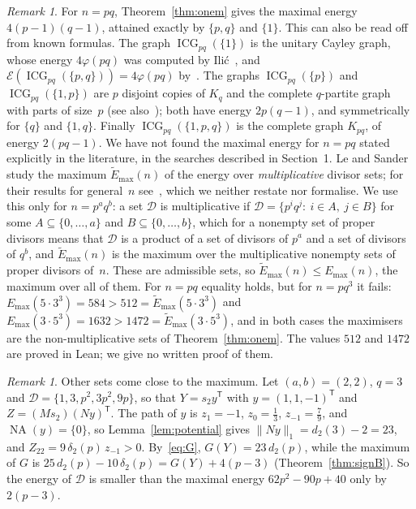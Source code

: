 \documentclass[11pt]{article}
\theoremstyle{remark}
\newtheorem{remark}[theorem]{Remark}
\newcommand{\ICG}{\operatorname{ICG}}
\newcommand{\E}{\mathcal E}
\newcommand{\NA}{\operatorname{NA}}
\begin{document}
\begin{remark}\label{rem:pq}
For $n=pq$, Theorem~\ref{thm:onem} gives the maximal energy $4(p-1)(q-1)$,
attained exactly by $\{p,q\}$ and $\{1\}$. This can also be read off from
known formulas. The graph $\ICG_{pq}(\{1\})$ is the unitary Cayley graph,
whose energy $4\varphi(pq)$ was computed by Ili\'c~\cite{ilic}, and
$\E(\ICG_{pq}(\{p,q\}))=4\varphi(pq)$ by~\cite[Theorem~4.2]{ilicbasic}. The
graphs $\ICG_{pq}(\{p\})$ and $\ICG_{pq}(\{1,p\})$ are $p$ disjoint copies of
$K_q$ and the complete $q$-partite graph with parts of size~$p$
(see also~\cite[Theorem~4.1]{ilicbasic}); both have energy $2p(q-1)$, and
symmetrically for $\{q\}$ and $\{1,q\}$. Finally $\ICG_{pq}(\{1,p,q\})$ is the
complete graph $K_{pq}$, of energy $2(pq-1)$. We have not found the maximal
energy for $n=pq$ stated explicitly in the literature, in the searches described
in Section~1. Le and Sander~\cite{lesander} study the maximum
$\tilde E_{\max}(n)$ of the energy over \emph{multiplicative} divisor sets; for
their results for general~$n$ see~\cite[Theorem~2.1 and Corollary~2.1]{lesander},
which we neither restate nor formalise. We use this only for $n=p^aq^b$: a set $\mathcal D$ is multiplicative if
$\mathcal D=\{p^iq^j:\ i\in A,\ j\in B\}$ for some $A\subseteq\{0,\dots,a\}$ and
$B\subseteq\{0,\dots,b\}$, which for a nonempty set of proper divisors means
that $\mathcal D$ is a product of a set of divisors of $p^a$ and a set of
divisors of $q^b$, and $\tilde E_{\max}(n)$ is the maximum over the
multiplicative nonempty sets of proper divisors of~$n$. These are admissible sets,
so $\tilde E_{\max}(n)\le E_{\max}(n)$, the maximum over all of them. For $n=pq$
equality holds, but for $n=pq^3$ it fails: $E_{\max}(5\cdot3^3)=584>512=\tilde
E_{\max}(5\cdot3^3)$ and $E_{\max}(3\cdot5^3)=1632>1472=\tilde
E_{\max}(3\cdot5^3)$, and in both cases the maximisers are the
non-multiplicative sets of Theorem~\ref{thm:onem}. The values $512$ and $1472$
are proved in Lean; we give no written proof of them.
\end{remark}

\begin{remark}\label{rem:near}
Other sets come close to the maximum. Let $(a,b)=(2,2)$, $q=3$ and
$\mathcal D=\{1,3,p^2,3p^2,9p\}$, so that $Y=s_2y^{\mathsf T}$ with
$y=(1,1,-1)^{\mathsf T}$ and $Z=(Ms_2)(Ny)^{\mathsf T}$. The path of $y$ is
$z_1=-1$, $z_0=\frac13$, $z_{-1}=\frac79$, and $\NA(y)=\{0\}$, so
Lemma~\ref{lem:potential} gives $\|Ny\|_1=d_2(3)-2=23$, and
$Z_{22}=9\,\delta_2(p)\,z_{-1}>0$. By~\eqref{eq:G}, $G(Y)=23\,d_2(p)$, while
the maximum of $G$ is $25\,d_2(p)-10\,\delta_2(p)=G(Y)+4(p-3)$
(Theorem~\ref{thm:signB}). So the energy of $\mathcal D$ is smaller than
the maximal energy $62p^2-90p+40$ only by $2(p-3)$.
\end{remark}
\end{document}
